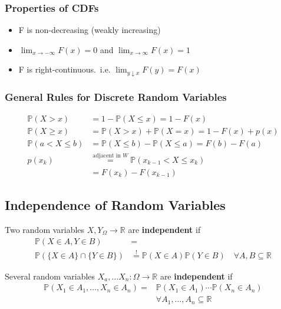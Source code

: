 \subsubsection{Properties of CDFs}
\begin{itemize}
    \item F is non-decreasing (weakly increasing)
    \item $\lim_{x\rightarrow -\infty}F(x)=0$ and $\lim_{x\rightarrow \infty}F(x)=1$
    \item F is right-continuous.\ i.e. $\lim_{y\downarrow x} F(y) =F(x)$
\end{itemize}

\subsubsection{General Rules for Discrete Random Variables}
\noindent\begin{align*}
    \mathbb{P}(X>x)       & =1-\mathbb{P}(X\leq x)=1-F(x)                                   \\
    \mathbb{P}(X\geq x)   & =\mathbb{P}(X>x)+\mathbb{P}(X=x)=1-F(x)+p(x)                    \\
    \mathbb{P}(a<X\leq b) & =\mathbb{P}(X\leq b)-\mathbb{P}(X\leq a)=F(b)-F(a)              \\
    p(x_k)                & \overset{\text{adjacent in } W}{=}\mathbb{P}(x_{k-1}<X\leq x_k) \\
                          & =F(x_k)-F(x_{k-1})
\end{align*}

\subsection{Independence of Random Variables}
Two random variables $X,Y_\Omega \rightarrow\mathbb{R}$ are \textbf{independent} if
\noindent\begin{align*}
    \mathbb{P}(X\in A,Y\in B)            & =                                                                                     \\
    \mathbb{P}(\{X\in A\}\cap\{Y\in B\}) & \overset{!}{=}\mathbb{P}(X\in A)\mathbb{P}(Y\in B)\quad\forall A,B\subseteq\mathbb{R}
\end{align*}

Several random variables $X_a, \dots X_n :\Omega\rightarrow\mathbb{R}$ are \textbf{independent} if
\noindent\begin{align*}
    \mathbb{P}(X_1\in A_1,\ldots,X_n\in A_n) = & \mathbb{P}(X_1\in A_1)\cdots\mathbb{P}(X_n\in A_n) \\
                                               & \forall A_1,\ldots,A_n\subseteq\mathbb{R}
\end{align*}

